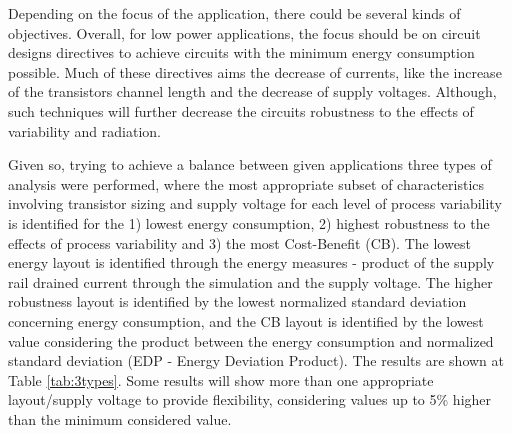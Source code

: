 \documentclass[diss,pgmicro,english]{iiufrgs}
\begin{document}





Depending on the focus of the application, there could be several kinds of objectives. Overall, for low power applications, the focus should be on circuit designs directives to achieve circuits with the minimum energy consumption possible. Much of these directives aims the decrease of currents, like the increase of the transistors channel length and the decrease of supply voltages. Although, such techniques will further decrease the circuits robustness to the effects of variability and radiation.

Given so, trying to achieve a balance between given applications three types of analysis were performed, where the most appropriate subset of characteristics involving transistor sizing and supply voltage for each level of process variability is identified for the 1) lowest energy consumption, 2) highest robustness to the effects of process variability and 3) the most Cost-Benefit (CB). The lowest energy layout is identified through the energy measures - product of the supply rail drained current through the simulation and the supply voltage. The higher robustness layout is identified by the lowest normalized standard deviation concerning energy consumption, and the CB layout is identified by the lowest value considering the product between the energy consumption and normalized standard deviation (EDP - Energy Deviation Product). The results are shown at Table \ref{tab:3types}. Some results will show more than one appropriate layout/supply voltage to provide flexibility, considering values up to 5\% higher than the minimum considered value.
\end{document}
